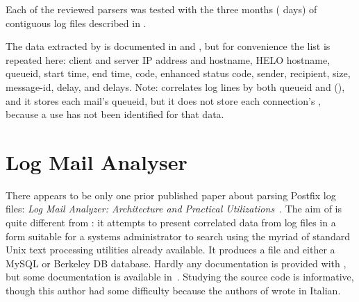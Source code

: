 Each of the reviewed parsers was tested with the three months
(\numberOFlogFILES{} days) of contiguous log files described in
.

The data extracted by \parsername{} is documented in
 and , but for
convenience the list is repeated here: client and server IP address and
hostname, HELO hostname, queueid, start time, end time, 
code, enhanced status code, sender, recipient, size, message-id, delay, and
delays.  Note: \parsername{} correlates log lines by both queueid and
 (), and it stores each mail's
queueid, but it does not store each connection's , because a
use has not been identified for that data.

\section{Log Mail Analyser}

\label{log mail analyser}

There appears to be only one prior published paper about parsing Postfix
log files: \textit{Log Mail Analyzer: Architecture and Practical
Utilizations\/}~\cite{log-mail-analyser}.  The aim of  is
quite different from \parsername{}: it attempts to present correlated data
from log files in a form suitable for a systems administrator to search
using the myriad of standard Unix text processing utilities already
available.  It produces a  file and either a MySQL or Berkeley
DB database.  Hardly any documentation is provided with , but
some documentation is available in~\cite{log-mail-analyser}.  Studying the
source code is informative, though this author had some difficulty because
the authors of  wrote in Italian.

